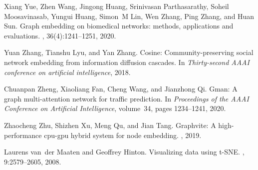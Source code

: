 \documentclass{IEEEtran}
\begin{document}
\begin{thebibliography}{00}
Xiang Yue, Zhen Wang, Jingong Huang, Srinivasan Parthasarathy, Soheil
  Moosavinasab, Yungui Huang, Simon~M Lin, Wen Zhang, Ping Zhang, and Huan Sun.
\newblock Graph embedding on biomedical networks: methods, applications and
  evaluations.
, 36(4):1241--1251, 2020.

Yuan Zhang, Tianshu Lyu, and Yan Zhang.
\newblock Cosine: Community-preserving social network embedding from
  information diffusion cascades.
\newblock In {\em Thirty-second AAAI conference on artificial intelligence},
  2018.

Chuanpan Zheng, Xiaoliang Fan, Cheng Wang, and Jianzhong Qi.
\newblock Gman: A graph multi-attention network for traffic prediction.
\newblock In {\em Proceedings of the AAAI Conference on Artificial
  Intelligence}, volume~34, pages 1234--1241, 2020.

Zhaocheng Zhu, Shizhen Xu, Meng Qu, and Jian Tang.
\newblock Graphvite: A high-performance cpu-gpu hybrid system for node
  embedding.
, 2019.

Laurens van~der Maaten and Geoffrey Hinton.
\newblock Visualizing data using {t-SNE}.
, 9:2579--2605, 2008.


\end{thebibliography}
\end{document}
